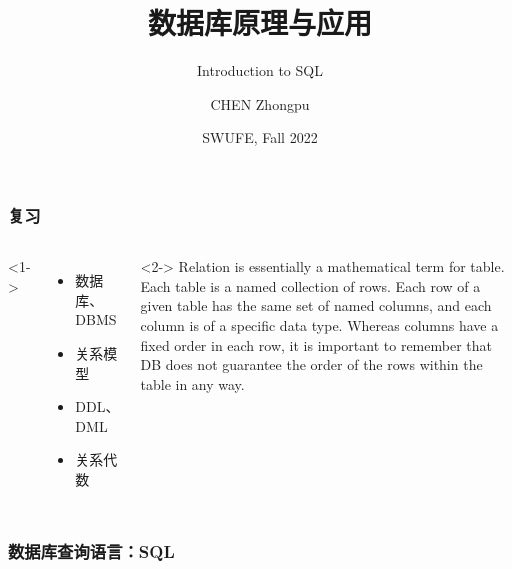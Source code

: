 \documentclass[aspectratio=169, 14pt]{beamer}
\title[Database Principles and Applications] %
{数据库原理与应用}
\subtitle{Introduction to SQL}
\author[CHEN Zhongpu] %
{CHEN Zhongpu}
\institute[] %
{
  School of Computing and Artificial Intelligence \\
  \href{mailto:zpchen@swufe.edu.cn}{zpchen@swufe.edu.cn}
}
\date[] %
{SWUFE, Fall 2022}
\begin{document}
\frame{\titlepage}

\begin{frame}[fragile]
    \frametitle{复习}
    \begin{columns}
        <1->
        \begin{itemize}
            \item 数据库、DBMS
            \item 关系模型
            \item DDL、DML
            \item 关系代数
        \end{itemize}
        <2->
        Relation is essentially a mathematical term for table. Each table is a named collection of rows. Each row of a given table has the same set of named columns, and each column is of a specific data type. Whereas columns have a fixed order in each row, it is important to remember that DB does not guarantee the order of the rows within the table in any way.
    \end{columns}

\end{frame}

\begin{frame}[fragile]
    \frametitle{数据库查询语言：SQL}
    \begin{center}
    \end{center}

    
\end{frame}
\end{document}
